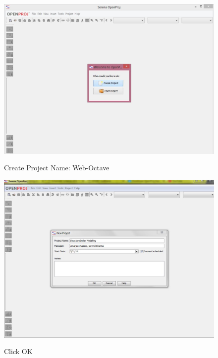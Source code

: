 \begin{figure}[!ht]
\centering
\includegraphics[width=0.7\linewidth]{input/images/image35.jpeg}
\label{fig:image1}
\caption{ Create Project Name: Web-Octave}
\end{figure}

\begin{figure}[!ht]
\centering
\includegraphics[width=0.7\linewidth]{input/images/image36.jpeg}
\label{fig:image1}
\caption{ Click OK}
\end{figure}



